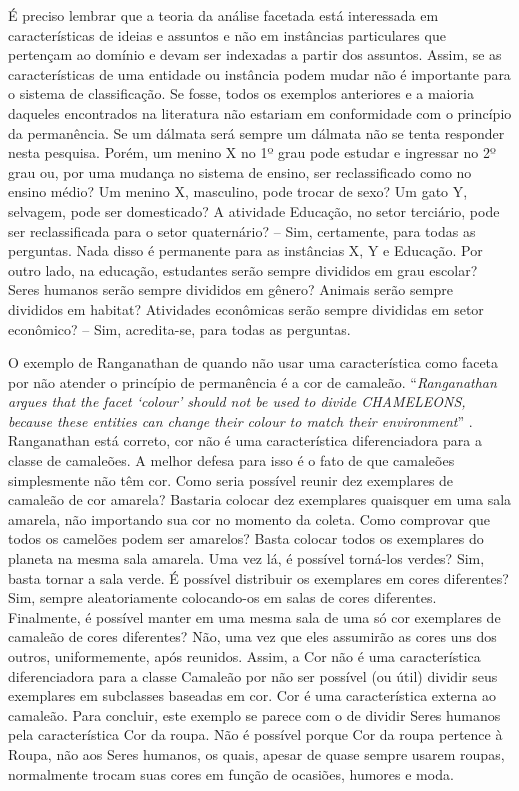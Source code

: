 É preciso lembrar que a teoria da análise facetada está interessada em características de ideias e assuntos e não em instâncias particulares que pertençam ao domínio e devam ser indexadas a partir dos assuntos. Assim, se as características de uma entidade ou instância podem mudar não é importante para o sistema de classificação. Se fosse, todos os exemplos anteriores e a maioria daqueles encontrados na literatura não estariam em conformidade com o princípio da permanência. Se um dálmata será sempre um dálmata não se tenta responder nesta pesquisa. Porém, um menino X no 1º grau pode estudar e ingressar no 2º grau ou, por uma mudança no sistema de ensino, ser reclassificado como no ensino médio? Um menino X, masculino, pode trocar de sexo? Um gato Y, selvagem, pode ser domesticado? A atividade Educação, no setor terciário, pode ser reclassificada para o setor quaternário? -- Sim, certamente, para todas as perguntas. Nada disso é permanente para as instâncias X, Y e Educação. Por outro lado, na educação, estudantes serão sempre divididos em grau escolar? Seres humanos serão sempre divididos em gênero? Animais serão sempre divididos em habitat? Atividades econômicas serão sempre divididas em setor econômico? -- Sim, acredita-se, para todas as perguntas.

O exemplo de Ranganathan de quando não usar uma característica como faceta por não atender o princípio de permanência é a cor de camaleão. ``\textit{Ranganathan argues that the facet `colour' should not be used to divide CHAMELEONS, because these entities can change their colour to match their environment}'' \cite[Sec. 3]{spiteri98simplified}. Ranganathan está correto, cor não é uma característica diferenciadora para a classe de camaleões. A melhor defesa para isso é o fato de que camaleões simplesmente não têm cor. Como seria possível reunir dez exemplares de camaleão de cor amarela? Bastaria colocar dez exemplares quaisquer em uma sala amarela, não importando sua cor no momento da coleta. Como comprovar que todos os camelões podem ser amarelos? Basta colocar todos os exemplares do planeta na mesma sala amarela. Uma vez lá, é possível torná-los verdes? Sim, basta tornar a sala verde. É possível distribuir os exemplares em cores diferentes? Sim, sempre aleatoriamente colocando-os em salas de cores diferentes. Finalmente, é possível manter em uma mesma sala de uma só cor exemplares de camaleão de cores diferentes? Não, uma vez que eles assumirão as cores uns dos outros, uniformemente, após reunidos. Assim, a Cor não é uma característica diferenciadora para a classe Camaleão por não ser possível (ou útil) dividir seus exemplares em subclasses baseadas em cor. Cor é uma característica externa ao camaleão. Para concluir, este exemplo se parece com o de dividir Seres humanos pela característica Cor da roupa. Não é possível porque Cor da roupa pertence à Roupa, não aos Seres humanos, os quais, apesar de quase sempre usarem roupas, normalmente trocam suas cores em função de ocasiões, humores e moda.

